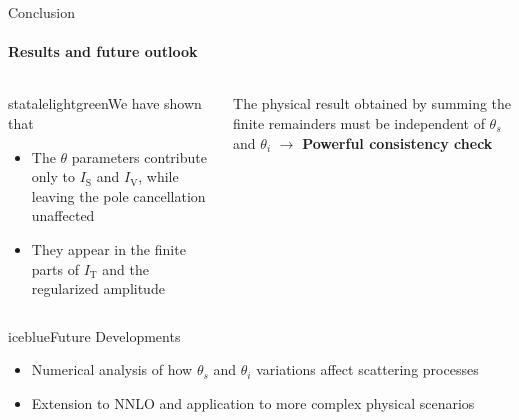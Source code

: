 \begin{frame} {Conclusion}
  \framesubtitle{Results and future outlook}

\begin{columns}
\begin{column}{0.60\textwidth}
    \begin{colorblock}[black]{statalelightgreen}{We have shown that}
  \begin{itemize}
    \item The $\theta$ parameters contribute only to $I_\mathrm{S}$ and $I_\mathrm{V}$, while leaving the pole cancellation unaffected
    \item They appear in the finite parts of $I_\mathrm{T}$ and the regularized amplitude
\end{itemize}
      \end{colorblock}

    \end{column}

    \begin{column}{0.40\textwidth}
    The physical result obtained by summing the finite remainders must be independent of $\theta_s$ and $\theta_i$
    $\to$ \textbf{Powerful consistency check}
    \end{column}
\end{columns}

 \vspace{1.5em}
\begin{colorblock}[black]{iceblue}{Future Developments}
  \begin{itemize}
    \item Numerical analysis of how $\theta_s$ and $\theta_i$ variations affect scattering processes
    \item Extension to NNLO and application to more complex physical scenarios
  \end{itemize}
\end{colorblock}

\end{frame}
